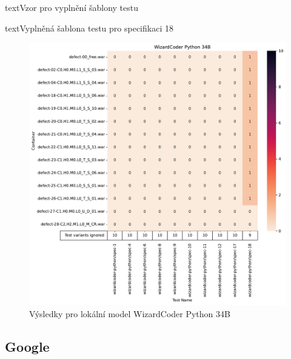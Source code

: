 \documentclass[czech, ma, kiv, he, iso690numb, pdf, viewonly]{fasthesis}
\begin{document}
\begin{code}{text}{Vzor pro vyplnění šablony testu \label{lst:template}}
{\begin{code}{text}{Vyplněná šablona testu pro specifikaci 18 \label{lst:spec18}}
{            \begin{figure}
                \includegraphics[width=\textwidth]{pic/wizardcoder-res.pdf}
                \caption{Výsledky pro lokální model WizardCoder Python 34B}
                \label{fig:res:wizardcoder}
            \end{figure}

        \pagebreak
        \subsection{Google} \label{sec:res:google}

}
\end{code}}
\end{code}
\end{document}
